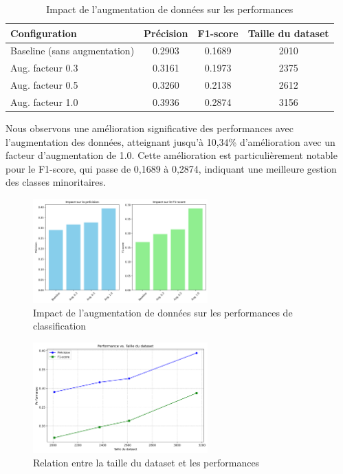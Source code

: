 \documentclass[a4paper,11pt]{article}
\begin{document}
\begin{table}[h]
\centering
\begin{tabular}{lccc}
\toprule
\textbf{Configuration} & \textbf{Précision} & \textbf{F1-score} & \textbf{Taille du dataset} \\
\midrule
Baseline (sans augmentation) & 0.2903 & 0.1689 & 2010 \\
Aug. facteur 0.3 & 0.3161 & 0.1973 & 2375 \\
Aug. facteur 0.5 & 0.3260 & 0.2138 & 2612 \\
Aug. facteur 1.0 & 0.3936 & 0.2874 & 3156 \\
\bottomrule
\end{tabular}
\caption{Impact de l'augmentation de données sur les performances}
\label{tab:augmentation-results}
\end{table}

Nous observons une amélioration significative des performances avec l'augmentation des données, atteignant jusqu'à 10,34\% d'amélioration avec un facteur d'augmentation de 1.0. Cette amélioration est particulièrement notable pour le F1-score, qui passe de 0,1689 à 0,2874, indiquant une meilleure gestion des classes minoritaires.

\begin{figure}[ht]
    \centering
    \includegraphics[width=0.6\textwidth]{results_rapport/augmentation_impact.png}
    \caption{Impact de l'augmentation de données sur les performances de classification}
    \label{fig:augmentation-impact}
\end{figure}

\begin{figure}[ht]
    \centering
    \includegraphics[width=0.6\textwidth]{results_rapport/dataset_size_vs_performance.png}
    \caption{Relation entre la taille du dataset et les performances}
    \label{fig:dataset-size-vs-performance}
\end{figure}
\end{document}
